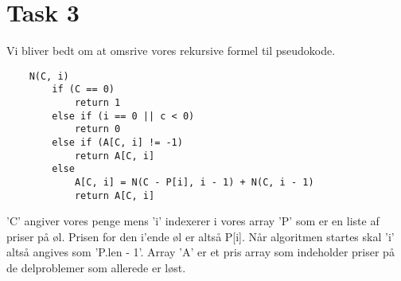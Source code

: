 \section{Task 3}
Vi bliver bedt om at omsrive vores rekursive formel til pseudokode.
\begin{lstlisting}
	N(C, i)
		if (C == 0)
			return 1
		else if (i == 0 || c < 0)
			return 0
		else if (A[C, i] != -1)
			return A[C, i]
		else
			A[C, i] = N(C - P[i], i - 1) + N(C, i - 1)
			return A[C, i]
\end{lstlisting}
'C' angiver vores penge mens 'i' indexerer i vores array 'P' som er en liste af priser på øl. Prisen for den i'ende øl er altså P[i]. Når algoritmen startes skal 'i' altså angives som 'P.len - 1'. Array 'A' er et pris array som indeholder priser på de delproblemer som allerede er løst.

